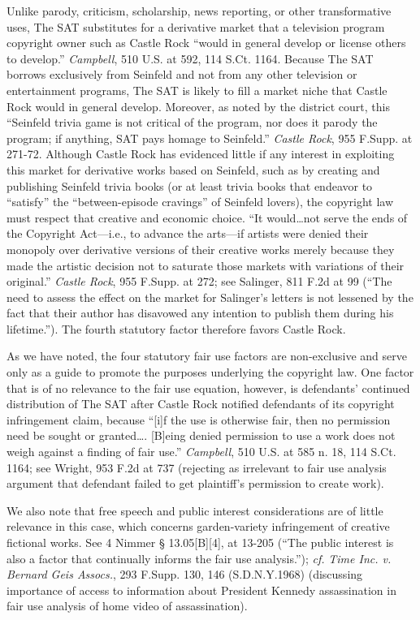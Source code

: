 Unlike parody, criticism, scholarship, news reporting, or other transformative
uses, The SAT substitutes for a derivative market that a television program
copyright owner such as Castle Rock ``would in general develop or license
others to develop.'' \emph{Campbell}, 510 U.S. at 592, 114 S.Ct.
1164. Because The SAT borrows exclusively from Seinfeld
and not from any other television or entertainment programs, The SAT is likely
to fill a market niche that Castle Rock would in general develop. Moreover, as
noted by the district court, this ``Seinfeld trivia game is not critical of the
program, nor does it parody the program; if anything, SAT pays homage to
Seinfeld.'' \emph{Castle Rock}, 955 F.Supp. at 271-72. Although Castle Rock has
evidenced little if any interest in exploiting this market for derivative works
based on Seinfeld, such as by creating and publishing Seinfeld trivia books (or
at least trivia books that endeavor to ``satisfy'' the ``between-episode
cravings'' of Seinfeld lovers), the copyright law must respect that creative
and economic choice. ``It would\ldots not serve the ends of the Copyright
Act---i.e., to advance the arts---if artists were denied their monopoly over
derivative versions of their creative works merely because they made the
artistic decision not to saturate those markets with variations of their
original.'' \emph{Castle Rock}, 955 F.Supp. at 272; see Salinger, 811 F.2d at 99
(``The need to assess the effect on the market for Salinger's letters is not
lessened by the fact that their author has disavowed any intention to publish
them during his lifetime.''). The fourth statutory factor therefore favors
Castle Rock.


As we have noted, the four statutory fair use factors are non-exclusive and
serve only as a guide to promote the purposes underlying the copyright law. One
factor that is of no relevance to the fair use equation, however, is
defendants' continued distribution of The SAT after Castle Rock notified
defendants of its copyright infringement claim, because ``[i]f the use is
otherwise fair, then no permission need be sought or granted\ldots. [B]eing
denied
permission to use a work does not weigh against a finding of fair use.''
\emph{Campbell}, 510 U.S. at 585 n. 18, 114 S.Ct. 1164; see Wright, 953 F.2d at
737
(rejecting as irrelevant to fair use analysis argument that defendant failed to
get plaintiff's permission to create work).

We also note that free speech and public interest considerations are of little
relevance in this case, which concerns garden-variety infringement of creative
fictional works. See 4 Nimmer {\S} 13.05[B][4], at 13-205 (``The public
interest is also a factor that continually informs the fair use analysis.'');
\emph{cf.} \emph{Time Inc. v. Bernard Geis Assocs.}, 293 F.Supp. 130, 146
(S.D.N.Y.1968)
(discussing importance of access to information about President Kennedy
assassination in fair use analysis of home video of assassination).

